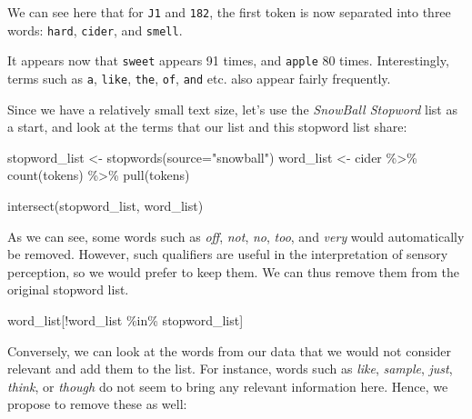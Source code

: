 \documentclass[
]{book}
\newenvironment{Shaded}{\begin{snugshade}}{\end{snugshade}}
\newcommand{\AttributeTok}[1]{\textcolor[rgb]{0.77,0.63,0.00}{#1}}
\newcommand{\FunctionTok}[1]{\textcolor[rgb]{0.00,0.00,0.00}{#1}}
\newcommand{\NormalTok}[1]{#1}
\newcommand{\OtherTok}[1]{\textcolor[rgb]{0.56,0.35,0.01}{#1}}
\newcommand{\SpecialCharTok}[1]{\textcolor[rgb]{0.00,0.00,0.00}{#1}}
\newcommand{\StringTok}[1]{\textcolor[rgb]{0.31,0.60,0.02}{#1}}
\begin{document}
We can see here that for \texttt{J1} and \texttt{182}, the first token is now separated into three words: \texttt{hard}, \texttt{cider}, and \texttt{smell}.

It appears now that \texttt{sweet} appears 91 times, and \texttt{apple} 80 times. Interestingly, terms such as \texttt{a}, \texttt{like}, \texttt{the}, \texttt{of}, \texttt{and} etc. also appear fairly frequently.

Since we have a relatively small text size, let's use the \emph{SnowBall Stopword} list as a start, and look at the terms that our list and this stopword list share:

\begin{Shaded}
\begin{Highlighting}[]
\NormalTok{stopword\_list }\OtherTok{\textless{}{-}} \FunctionTok{stopwords}\NormalTok{(}\AttributeTok{source=}\StringTok{"snowball"}\NormalTok{)}
\NormalTok{word\_list }\OtherTok{\textless{}{-}}\NormalTok{ cider }\SpecialCharTok{\%\textgreater{}\%} 
  \FunctionTok{count}\NormalTok{(tokens) }\SpecialCharTok{\%\textgreater{}\%} 
  \FunctionTok{pull}\NormalTok{(tokens)}

\FunctionTok{intersect}\NormalTok{(stopword\_list, word\_list)}
\end{Highlighting}
\end{Shaded}

As we can see, some words such as \emph{off}, \emph{not}, \emph{no}, \emph{too}, and \emph{very} would automatically be removed. However, such qualifiers are useful in the interpretation of sensory perception, so we would prefer to keep them. We can thus remove them from the original stopword list.

\begin{Shaded}
\begin{Highlighting}[]
\NormalTok{word\_list[}\SpecialCharTok{!}\NormalTok{word\_list }\SpecialCharTok{\%in\%}\NormalTok{ stopword\_list]}
\end{Highlighting}
\end{Shaded}

Conversely, we can look at the words from our data that we would not consider relevant and add them to the list. For instance, words such as \emph{like}, \emph{sample}, \emph{just}, \emph{think}, or \emph{though} do not seem to bring any relevant information here. Hence, we propose to remove these as well:
\end{document}
